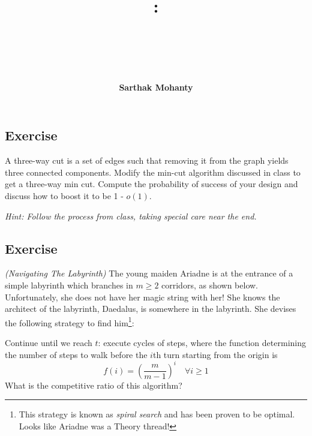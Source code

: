 \documentclass[14pt]{extreport}
\title{
    \vspace{1.75in}
    \textbf{\lectClass:\\ \lectTitle}\\
    \vspace{0.1in}\large{\textit{\lectClassInstructor\ \lectSection}}
    \vspace{2in}
    \author{\textbf{Sarthak Mohanty}}
    \date{}
}
\newcounter{counter}
\newcommand{\Exercise}{Exercise \stepcounter{counter}\thecounter}
\begin{document}
\maketitle
\pagebreak

\subsection*{\Exercise}
    A three-way cut is a set of edges such that removing it from the graph yields three connected components. Modify the min-cut algorithm discussed in class to get a three-way min cut. Compute the probability of success of your design and discuss how to boost it to be 1 - $o(1)$.
    
    \vspace{3mm}
    \textit{Hint: Follow the process from class, taking special care near the end.}

\subsection*{\Exercise}
    \textit{(Navigating The Labyrinth)}
    The young maiden Ariadne is at the entrance of a simple labyrinth which branches in $m \ge 2$ corridors, as shown below. Unfortunately, she does not have her magic string with her! She knows the architect of the labyrinth, Daedalus, is somewhere in the labyrinth. She devises the following strategy to find him\footnote{This strategy is known as \textit{spiral search} and has been proven to be optimal. Looks like Ariadne was a Theory thread!}:

    \vspace{3mm}
    Continue until we reach $t$: execute cycles of steps, where the function determining the number of steps to walk before the $i$th turn starting from the origin is
    $$f(i) = \left(\frac{m}{m - 1}\right)^{i} \quad\forall i \ge 1$$
    What is the competitive ratio of this algorithm?
\end{document}
